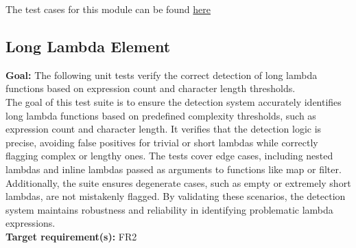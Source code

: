 \documentclass[12pt, titlepage]{article}
\begin{document}
\noindent The test cases for this module can be found \href{https://github.com/ssm-lab/capstone--source-code-optimizer/blob/new-poc/tests/analyzers/test_long_message_chain.py}{here}


\subsection{Long Lambda Element}

\textbf{Goal:} The following unit tests verify the correct detection of long lambda functions based on expression count and character length thresholds.\\

\noindent The goal of this test suite is to ensure the detection system accurately identifies long lambda 
functions based on predefined complexity thresholds, such as expression count and character 
length. It verifies that the detection logic is precise, avoiding false positives for trivial 
or short lambdas while correctly flagging complex or lengthy ones. The tests cover edge cases, 
including nested lambdas and inline lambdas passed as arguments to functions like map or 
filter. Additionally, the suite ensures degenerate cases, such as empty or extremely short 
lambdas, are not mistakenly flagged. By validating these scenarios, the detection system 
maintains robustness and reliability in identifying problematic lambda expressions.\\

\noindent\textbf{Target requirement(s):} FR2 ~\cite{SRS} \\
\end{document}
